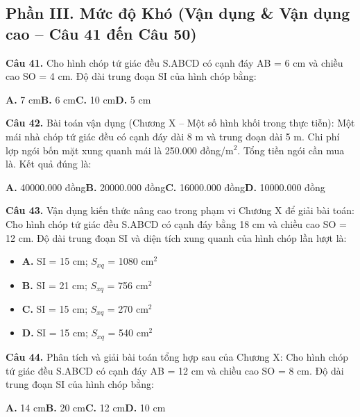 \documentclass[11pt,a4paper]{article}
\begin{document}
\subsection*{\color{accent} Phần III. Mức độ Khó (Vận dụng \& Vận dụng cao -- Câu 41 đến Câu 50)}
\textbf{\color{primary} Câu 41.} Cho hình chóp tứ giác đều S.ABCD có cạnh đáy AB = 6 cm và chiều cao SO = 4 cm. Độ dài trung đoạn SI của hình chóp bằng:\par
\hspace*{1.5em}\textbf{A.} 7 cm\quad\quad \textbf{B.} 6 cm\quad\quad \textbf{C.} 10 cm\quad\quad \textbf{D.} 5 cm\par\vspace{2pt}
\textbf{\color{primary} Câu 42.} Bài toán vận dụng (Chương X – Một số hình khối trong thực tiễn): Một mái nhà chóp tứ giác đều có cạnh đáy dài 8 m và trung đoạn dài 5 m. Chi phí lợp ngói bốn mặt xung quanh mái là 250.000 đồng/m$^2$. Tổng tiền ngói cần mua là. Kết quả đúng là:\par
\hspace*{1.5em}\textbf{A.} 40000.000 đồng\quad\quad \textbf{B.} 20000.000 đồng\quad\quad \textbf{C.} 16000.000 đồng\quad\quad \textbf{D.} 10000.000 đồng\par\vspace{2pt}
\textbf{\color{primary} Câu 43.} Vận dụng kiến thức nâng cao trong phạm vi Chương X để giải bài toán: Cho hình chóp tứ giác đều S.ABCD có cạnh đáy bằng 18 cm và chiều cao SO = 12 cm. Độ dài trung đoạn SI và diện tích xung quanh của hình chóp lần lượt là:\par
\begin{itemize}\setlength{\itemsep}{1pt}\setlength{\parskip}{0pt}
  \item[] \textbf{A.} SI = 15 cm; $S_{xq}$ = 1080 cm$^2$
  \item[] \textbf{B.} SI = 21 cm; $S_{xq}$ = 756 cm$^2$
  \item[] \textbf{C.} SI = 15 cm; $S_{xq}$ = 270 cm$^2$
  \item[] \textbf{D.} SI = 15 cm; $S_{xq}$ = 540 cm$^2$
\end{itemize}\vspace{2pt}
\textbf{\color{primary} Câu 44.} Phân tích và giải bài toán tổng hợp sau của Chương X: Cho hình chóp tứ giác đều S.ABCD có cạnh đáy AB = 12 cm và chiều cao SO = 8 cm. Độ dài trung đoạn SI của hình chóp bằng:\par
\hspace*{1.5em}\textbf{A.} 14 cm\quad\quad \textbf{B.} 20 cm\quad\quad \textbf{C.} 12 cm\quad\quad \textbf{D.} 10 cm\par\vspace{2pt}
\end{document}
